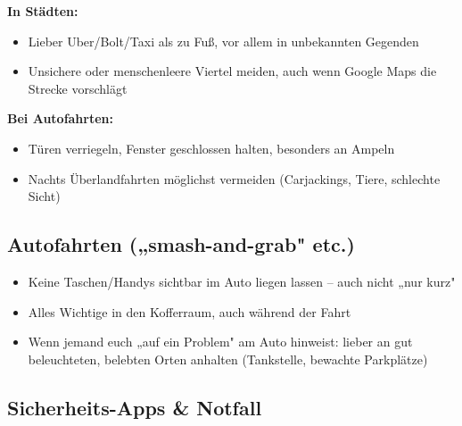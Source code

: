 \documentclass[12pt,a4paper]{article}
\begin{document}
\begin{tcolorbox}[enhanced,colback=darkgray!8,colframe=darkgray,
    title={\faMoon \hspace{0.2cm} Nach Einbruch der Dunkelheit},
    fonttitle=\bfseries\sffamily\color{white},
    coltitle=white,
    arc=4mm,boxrule=1.5pt,
    shadow={2mm}{-2mm}{0mm}{darkgray!20}]

\textbf{\color{mainblue}In Städten:}
\begin{itemize}[leftmargin=*,label={\color{accentorange}\faChevronRight}]
    \item Lieber Uber/Bolt/Taxi als zu Fuß, vor allem in unbekannten Gegenden
    \item Unsichere oder menschenleere Viertel meiden, auch wenn Google Maps die Strecke vorschlägt
\end{itemize}

\vspace{0.2cm}

\textbf{\color{warningred}Bei Autofahrten:}
\begin{itemize}[leftmargin=*,label={\color{warningred}\faChevronRight}]
    \item Türen verriegeln, Fenster geschlossen halten, besonders an Ampeln\cite{southafrica-diplo-1}
    \item Nachts Überlandfahrten möglichst vermeiden (Carjackings, Tiere, schlechte Sicht)\cite{auswaertiges-amt-1}
\end{itemize}

\end{tcolorbox}

\subsection{Autofahrten („smash-and-grab" etc.)}

\begin{itemize}[leftmargin=*,label={\color{warningred}\faExclamationCircle}]
    \item Keine Taschen/Handys sichtbar im Auto liegen lassen – auch nicht „nur kurz"
    \item Alles Wichtige in den Kofferraum, auch während der Fahrt
    \item Wenn jemand euch „auf ein Problem" am Auto hinweist: lieber an gut beleuchteten, belebten Orten anhalten (Tankstelle, bewachte Parkplätze)
\end{itemize}

\subsection{Sicherheits-Apps \& Notfall}
\end{document}
